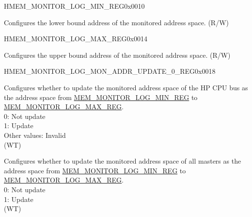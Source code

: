 \begin{register}{H}{MEM\_MONITOR\_LOG\_MIN\_REG}{0x0010}\label{regdesc:MEMMONITORLOGMINREG}
%
\regnewline%
\begin{regdesc}\begin{reglist}
\label{fielddesc:MEMMONITORLOGMIN}\item [MEM\_MONITOR\_LOG\_MIN] Configures the lower bound address of the monitored address space. (R/W)
\end{reglist}\end{regdesc}
\end{register}


\begin{register}{H}{MEM\_MONITOR\_LOG\_MAX\_REG}{0x0014}\label{regdesc:MEMMONITORLOGMAXREG}
%
\regnewline%
\begin{regdesc}\begin{reglist}
\label{fielddesc:MEMMONITORLOGMAX}\item [MEM\_MONITOR\_LOG\_MAX] Configures the upper bound address of the monitored address space. (R/W)
\end{reglist}\end{regdesc}
\end{register}


\begin{register}{H}{MEM\_MONITOR\_LOG\_MON\_ADDR\_UPDATE\_0\_REG}{0x0018}\label{regdesc:MEMMONITORLOGMONADDRUPDATE0REG}
%
%
%
\regnewline%
\begin{regdesc}\begin{reglist}
\label{fielddesc:MEMMONITORLOGMONADDRCOREUPDATE}\item [MEM\_MONITOR\_LOG\_MON\_ADDR\_CORE\_UPDATE] Configures whether to update the monitored address space of the HP CPU bus as the address space from \hyperref[regdesc:MEMMONITORLOGMINREG]{MEM\_MONITOR\_LOG\_MIN\_REG} to \hyperref[regdesc:MEMMONITORLOGMAXREG]{MEM\_MONITOR\_LOG\_MAX\_REG}.\\
0: Not update\\
1: Update\\
Other values: Invalid\\
(WT)
\label{fielddesc:MEMMONITORLOGMONADDRALLUPDATE}\item [MEM\_MONITOR\_LOG\_MON\_ADDR\_ALL\_UPDATE] Configures whether to update the monitored address space of all masters as the address space from \hyperref[regdesc:MEMMONITORLOGMINREG]{MEM\_MONITOR\_LOG\_MIN\_REG} to \hyperref[regdesc:MEMMONITORLOGMAXREG]{MEM\_MONITOR\_LOG\_MAX\_REG}.\\
0: Not update\\ 
1: Update\\
(WT)
\end{reglist}\end{regdesc}
\end{register}


